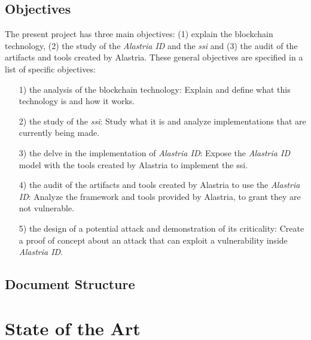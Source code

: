 \documentclass[a4paper, 12pt]{article} %
\begin{document}
        \subsection{Objectives}
            The present project has three main objectives: (1) explain the blockchain technology, (2) the study of the \textit{Alastria ID} and the \textit{\acrlong{ssi}} and (3) the audit of the artifacts and tools created by Alastria. These general objectives are specified in a list of specific objectives:
            \begin{itemize} 
                \item[1)] the analysis of the blockchain technology: Explain and define what this technology is and how it works.
                \item[2)] the study of the \textit{\acrlong{ssi}}: Study what it is and analyze implementations that are currently being made.
                \item[3)] the delve in the implementation of \textit{Alastria ID}: Expose the \textit{Alastria ID} model with the tools created by Alastria to implement the \acrlong{ssi}.
                \item[4)] the audit of the artifacts and tools created by Alastria to use the \textit{Alastria ID}: Analyze the framework and tools provided by Alastria, to grant they are not vulnerable.
                \item[5)] the design of a potential attack and demonstration of its criticality: Create a proof of concept about an attack that can exploit a vulnerability inside \textit{Alastria ID}.
            \end{itemize}
            
        \subsection{Document Structure}
        \newpage
        
\section{State of the Art}
\end{document}
